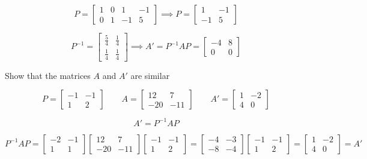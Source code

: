\documentclass{report}
\begin{document}
$$
P = \begin{bmatrix} 1 & 0 & 1 & -1 \\ 0 & 1 & -1 & 5 \end{bmatrix} \implies P = \begin{bmatrix}1 & -1 \\ -1 & 5 \end{bmatrix}
$$

$$
P^{-1} = \begin{bmatrix} \frac{5}{4} & \frac{1}{4} \\ \frac{1}{4} & \frac{1}{4} \end{bmatrix} \implies  A' = P^{-1} A P = \begin{bmatrix}-4 & 8 \\ 0 & 0 \end{bmatrix}
$$

\begin{tcolorbox}[colframe = lightred]
	Show that the matrices $A$ and $A'$ are similar
	
	$$
	P = \begin{bmatrix} -1 & -1 \\ 1 &2 \end{bmatrix} \quad \quad A = \begin{bmatrix} 12 & 7 \\ -20 & -11 \end{bmatrix} \quad \quad A' = \begin{bmatrix} 1 & -2 \\ 4 & 0 \end{bmatrix}
	$$
\end{tcolorbox}

$$
A' = P^{-1} A P
$$

$$
P^{-1} A P = \begin{bmatrix} -2 & -1 \\ 1 & 1 \end{bmatrix} \begin{bmatrix} 12 & 7 \\ -20 & -11 \end{bmatrix} \begin{bmatrix} -1 & -1 \\ 1 & 2 \end{bmatrix} = \begin{bmatrix} -4 & -3 \\ -8 & -4 \end{bmatrix} \begin{bmatrix} -1 & -1 \\ 1 & 2 \end{bmatrix} = \begin{bmatrix} 1 & -2 \\ 4 & 0 \end{bmatrix} = A'
$$
\end{document}
